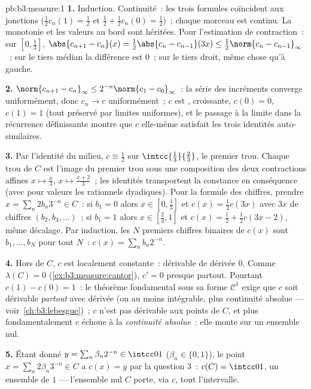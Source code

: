 \begin{solution}{pb:b3:measure:1}
\textbf{1.} Induction. Continuité~: les trois formules
coïncident aux jonctions ($\frac12c_n(1) = \frac12$ et
$\frac12 + \frac12c_n(0) = \frac12$)~; chaque morceau est
continu. La monotonie et les valeurs au bord sont héritées.
Pour l'estimation de contraction~: sur $[0,\frac13]$,
$\abs{c_{n+1} - c_n}(x) = \frac12\abs{c_n - c_{n-1}}(3x)
\leq \frac12\norm{c_n - c_{n-1}}_\infty$~; sur le tiers
médian la différence est $0$~; sur le tiers droit, même
chose qu'à gauche.

\textbf{2.} $\norm{c_{n+1} - c_n}_\infty \leq
2^{-n}\norm{c_1 - c_0}_\infty$~: la série des incréments
converge uniformément, donc $c_n \to c$ uniformément~; $c$
est , croissante, $c(0) = 0$, $c(1) = 1$ (tout
préservé par limites uniformes), et le passage à la limite
dans la récurrence définissante montre que $c$ elle-même
satisfait les trois identités auto-similaires.

\textbf{3.} Par l'identité du milieu, $c \equiv \frac12$ sur
$\intcc{\frac13}{\frac23}$, le premier trou. Chaque trou de
$C$ est l'image du premier trou sous une composition des
deux contractions affines $x \mapsto \frac x3$,
$x\mapsto\frac{x + 2}3$~; les identités transportent la
constance en conséquence (avec pour valeurs les rationnels
dyadiques). Pour la formule des chiffres, prendre $x =
\sum_n 2b_n3^{-n} \in C$~: si $b_1 = 0$ alors $x \in
[0,\frac13]$ et $c(x) = \frac12c(3x)$ avec $3x$ de chiffres
$(b_2, b_3, \dots)$~; si $b_1 = 1$ alors $x \in [\frac23,
1]$ et $c(x) = \frac12 + \frac12c(3x - 2)$, même décalage.
Par induction, les $N$ premiers chiffres binaires de $c(x)$
sont $b_1, \dots, b_N$ pour tout $N$~: $c(x) = \sum_n
b_n2^{-n}$.

\textbf{4.} Hors de $C$, $c$ est localement constante~:
dérivable de dérivée $0$. Comme $\lambda(C) = 0$
(\cref{ex:b3:measure:cantor}), $c' = 0$ presque partout.
Pourtant $c(1) - c(0) = 1$~: le théorème fondamental sous sa
forme $\mathcal C^1$ exige que $c$ soit dérivable
\emph{partout} avec dérivée  (ou au moins
intégrable, plus continuité absolue ---
voir~\cref{ch:b3:lebesgue})~; $c$ n'est pas dérivable aux
points de $C$, et plus fondamentalement $c$ échoue à la
\emph{continuité absolue}~: elle monte sur un ensemble nul.

\textbf{5.} Étant donné $y = \sum_n\beta_n2^{-n} \in
\intcc01$ ($\beta_n \in \{0,1\}$), le point $x =
\sum_n2\beta_n3^{-n} \in C$ a $c(x) = y$ par la question
3~: $c(C) = \intcc01$, un ensemble de  $1$ ---
l'ensemble nul $C$ porte, via $c$, tout l'intervalle.


\end{solution}
